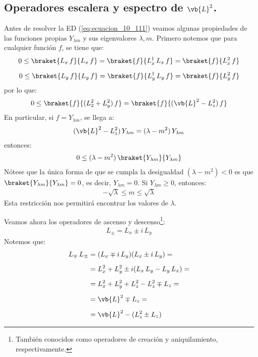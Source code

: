 \subsection{Operadores escalera y espectro de \texorpdfstring{$\vb{L}^{2}$}{L2}.}

Antes de resolver la ED (\ref{eq:ecuacion_10_111}) veamos algunas propiedades de las funciones propias $Y_{\lambda m}$ y sus eigenvalores $\lambda, m$. Primero notemos que para cualquier función $f$, se tiene que:
\begin{align*}
0 \leq \braket{L_{x} \, f}{L_{x} \, f} = \braket{f}{L_{x}^{\dagger} \, L_{x} \, f} = \braket{f}{L_{x}^{2} \, f} \\[0.5em]
0 \leq \braket{L_{y} \, f}{L_{y} \, f} = \braket{f}{L_{y}^{\dagger} \, L_{y} \, f} = \braket{f}{L_{y}^{2} \, f}
\end{align*}
por lo que:
\begin{align*}
0 \leq \braket{f}{(L_{2}^{2} + L_{y}^{2}) \, f} = \braket{f}{(\vb{L}^{2} - L_{z}^{2}) \, f}
\end{align*}
En particular, si $f = Y_{\lambda m}$, se llega a:
\begin{align}
(\vb{L}^{2} - L_{z}^{2}) \, Y_{\lambda m} = (\lambda - m^{2}) \, Y_{\lambda m}
\label{eq:ecuacion_10_128}
\end{align}
entonces:
\begin{align}
0 \leq (\lambda - m^{2}) \, \braket{Y_{\lambda m}}{Y_{\lambda m}}
\label{eq:ecuacion_10_129}
\end{align}
Nótese que la única forma de que se cumpla la desigualdad $(\lambda - m^{2}) < 0$ es que $\braket{Y_{\lambda m}}{Y_{\lambda m}} = 0$, es decir, $Y_{\lambda m} = 0$. Si $Y_{\lambda m} \geq 0$, entonces:
\begin{align}
- \sqrt{\lambda} \leq m \leq \sqrt{\lambda}
\label{eq:ecuacion_10_130}
\end{align}                                                   
Esta restricción nos permitirá encontrar los valores de $\lambda$.
\par
Veamos ahora los operadores de ascenso y descenso\footnote{También conocidos como operadores de creación y aniquilamiento, respectivamente.}:
\begin{align}
L_{\pm} = L_{x} \pm i \, L_{y}
\label{eq:ecuacion_10_131}
\end{align}
Notemos que:
\begin{align*}
L_{\mp} \, L_{\pm} &= (L_{x} \mp i \, L_{y})(L_{x} \pm i \, L_{y}) = \\[0.5em]
&= L_{x}^{2} + L_{y}^{2} \pm i (L_{x} \,L_{y} - L_{y} \,L_{x}) = \\[0.5em]
&= L_{x}^{2} + L_{y}^{2} + L_{z}^{2} - L_{z}^{2} \mp L_{z} = \\[0.5em]
&= \vb{L}^{2} \mp L_{z} = \\[0.5em]
&= \vb{L}^{2} - (L_{z}^{2} \pm L_{z})
\end{align*}
